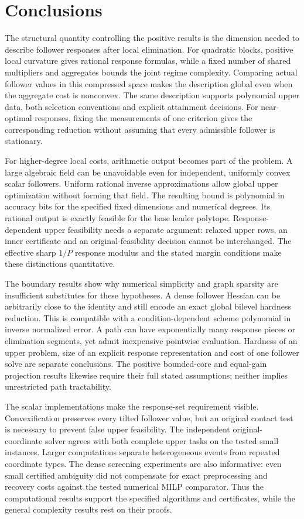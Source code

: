 \section{Conclusions}\label{sec:conclusions}

The structural quantity controlling the positive results is the dimension
needed to describe follower responses after local elimination. For quadratic
blocks, positive local curvature gives rational response formulas, while a
fixed number of shared multipliers and aggregates bounds the joint regime
complexity. Comparing actual follower values in this compressed space makes
the description global even when the aggregate cost is nonconvex. The same
description supports polynomial upper data, both selection conventions and
explicit attainment decisions. For near-optimal responses, fixing the
measurements of one criterion gives the corresponding reduction without
assuming that every admissible follower is stationary.

For higher-degree local costs, arithmetic output becomes part of the problem.
A large algebraic field can be unavoidable even for independent, uniformly
convex scalar followers. Uniform rational inverse approximations allow global
upper optimization without forming that field. The resulting bound is
polynomial in accuracy bits for the specified fixed dimensions and numerical
degrees. Its rational output is exactly feasible for the base leader polytope.
Response-dependent upper feasibility needs a separate argument: relaxed upper
rows, an inner certificate and an original-feasibility decision cannot be
interchanged. The effective sharp $1/P$ response modulus and the stated
margin conditions make these distinctions quantitative.

The boundary results show why numerical simplicity and graph sparsity are
insufficient substitutes for these hypotheses. A dense follower Hessian can
be arbitrarily close to the identity and still encode an exact global bilevel
hardness reduction. This is compatible with a condition-dependent scheme
polynomial in inverse normalized error. A path can have exponentially many
response pieces or elimination segments, yet admit inexpensive pointwise
evaluation. Hardness of an upper problem, size of an explicit response
representation and cost of one follower solve are separate conclusions.
The positive bounded-core and equal-gain projection results likewise require
their full stated assumptions; neither implies unrestricted path tractability.

The scalar implementations make the response-set requirement visible.
Convexification preserves every tilted follower value, but an original contact
test is necessary to prevent false upper feasibility. The independent
original-coordinate solver agrees with both complete upper tasks on the tested
small instances. Larger computations separate heterogeneous events from
repeated coordinate types. The dense screening experiments are also
informative: even small certified ambiguity did not compensate for exact
preprocessing and recovery costs against the tested numerical MILP comparator.
Thus the computational results support the specified algorithms and
certificates, while the general complexity results rest on their proofs.

